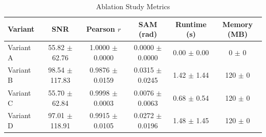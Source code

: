\begin{table}[ht]
\centering
\caption{Ablation Study Metrics}
\begin{tabular}{lccccc}
\hline
Variant & SNR & Pearson $r$ & SAM (rad) & Runtime (s) & Memory (MB) \\
\hline
Variant A & 55.82 $\pm$ 62.76 & 1.0000 $\pm$ 0.0000 & 0.0000 $\pm$ 0.0000 & 0.00 $\pm$ 0.00 & 0 $\pm$ 0 \\
Variant B & 98.54 $\pm$ 117.83 & 0.9876 $\pm$ 0.0159 & 0.0315 $\pm$ 0.0245 & 1.42 $\pm$ 1.44 & 120 $\pm$ 0 \\
Variant C & 55.70 $\pm$ 62.84 & 0.9998 $\pm$ 0.0003 & 0.0076 $\pm$ 0.0063 & 0.68 $\pm$ 0.54 & 120 $\pm$ 0 \\
Variant D & 97.01 $\pm$ 118.91 & 0.9915 $\pm$ 0.0105 & 0.0272 $\pm$ 0.0196 & 1.48 $\pm$ 1.45 & 120 $\pm$ 0 \\
\hline
\end{tabular}
\end{table}
